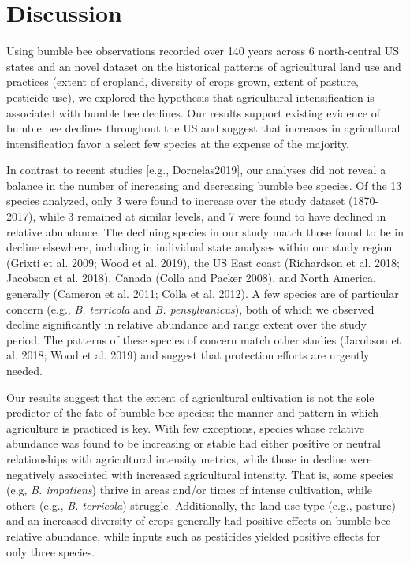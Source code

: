\documentclass[11pt,]{article}
\begin{document}
\hypertarget{discussion}{%
\section{Discussion}\label{discussion}}

Using bumble bee observations recorded over 140 years across 6
north-central US states and an novel dataset on the historical patterns
of agricultural land use and practices (extent of cropland, diversity of
crops grown, extent of pasture, pesticide use), we explored the
hypothesis that agricultural intensification is associated with bumble
bee declines. Our results support existing evidence of bumble bee
declines throughout the US and suggest that increases in agricultural
intensification favor a select few species at the expense of the
majority.

In contrast to recent studies {[}e.g., Dornelas2019{]}, our analyses did
not reveal a balance in the number of increasing and decreasing bumble
bee species. Of the 13 species analyzed, only 3 were found to increase
over the study dataset (1870-2017), while 3 remained at similar levels,
and 7 were found to have declined in relative abundance. The declining
species in our study match those found to be in decline elsewhere,
including in individual state analyses within our study region (Grixti
et al. 2009; Wood et al. 2019), the US East coast (Richardson et al.
2018; Jacobson et al. 2018), Canada (Colla and Packer 2008), and North
America, generally (Cameron et al. 2011; Colla et al. 2012). A few
species are of particular concern (e.g., \emph{B. terricola} and
\emph{B. pensylvanicus}), both of which we observed decline
significantly in relative abundance and range extent over the study
period. The patterns of these species of concern match other studies
(Jacobson et al. 2018; Wood et al. 2019) and suggest that protection
efforts are urgently needed.

Our results suggest that the extent of agricultural cultivation is not
the sole predictor of the fate of bumble bee species: the manner and
pattern in which agriculture is practiced is key. With few exceptions,
species whose relative abundance was found to be increasing or stable
had either positive or neutral relationships with agricultural intensity
metrics, while those in decline were negatively associated with
increased agricultural intensity. That is, some species (e.g, \emph{B.
impatiens}) thrive in areas and/or times of intense cultivation, while
others (e.g., \emph{B. terricola}) struggle. Additionally, the land-use
type (e.g., pasture) and an increased diversity of crops generally had
positive effects on bumble bee relative abundance, while inputs such as
pesticides yielded positive effects for only three species.
\end{document}
